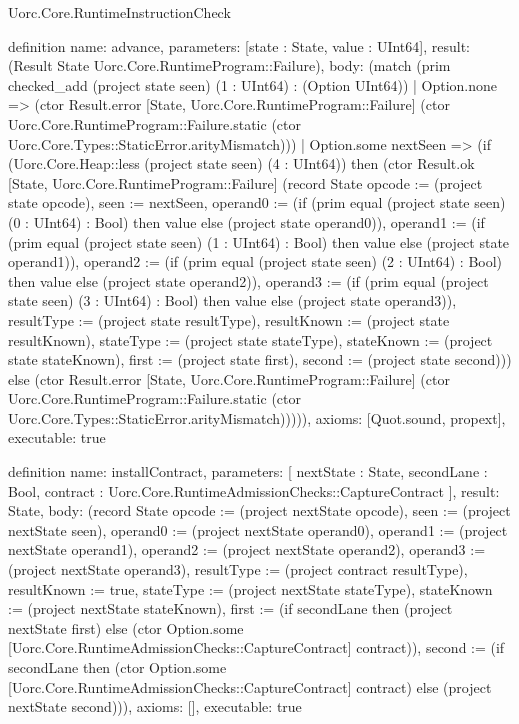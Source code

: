 \begin{lexlean}{Uorc.Core.RuntimeInstructionCheck}
\begin{semanticmodule}
definition{
  name: advance,
  parameters: [state : State, value : UInt64],
  result: (Result State Uorc.Core.RuntimeProgram::Failure),
  body: (match (prim checked_add (project state seen) (1 : UInt64) : (Option UInt64))
    | Option.none => (ctor Result.error [State, Uorc.Core.RuntimeProgram::Failure] (ctor Uorc.Core.RuntimeProgram::Failure.static (ctor Uorc.Core.Types::StaticError.arityMismatch)))
    | Option.some nextSeen => (if (Uorc.Core.Heap::less (project state seen) (4 : UInt64)) then (ctor Result.ok [State, Uorc.Core.RuntimeProgram::Failure] (record State {opcode := (project state opcode), seen := nextSeen, operand0 := (if (prim equal (project state seen) (0 : UInt64) : Bool) then value else (project state operand0)), operand1 := (if (prim equal (project state seen) (1 : UInt64) : Bool) then value else (project state operand1)), operand2 := (if (prim equal (project state seen) (2 : UInt64) : Bool) then value else (project state operand2)), operand3 := (if (prim equal (project state seen) (3 : UInt64) : Bool) then value else (project state operand3)), resultType := (project state resultType), resultKnown := (project state resultKnown), stateType := (project state stateType), stateKnown := (project state stateKnown), first := (project state first), second := (project state second)})) else (ctor Result.error [State, Uorc.Core.RuntimeProgram::Failure] (ctor Uorc.Core.RuntimeProgram::Failure.static (ctor Uorc.Core.Types::StaticError.arityMismatch))))),
  axioms: [Quot.sound, propext],
  executable: true
}

definition{
  name: installContract,
  parameters: [
    nextState : State,
    secondLane : Bool,
    contract : Uorc.Core.RuntimeAdmissionChecks::CaptureContract
  ],
  result: State,
  body: (record State {opcode := (project nextState opcode), seen := (project nextState seen), operand0 := (project nextState operand0), operand1 := (project nextState operand1), operand2 := (project nextState operand2), operand3 := (project nextState operand3), resultType := (project contract resultType), resultKnown := true, stateType := (project nextState stateType), stateKnown := (project nextState stateKnown), first := (if secondLane then (project nextState first) else (ctor Option.some [Uorc.Core.RuntimeAdmissionChecks::CaptureContract] contract)), second := (if secondLane then (ctor Option.some [Uorc.Core.RuntimeAdmissionChecks::CaptureContract] contract) else (project nextState second))}),
  axioms: [],
  executable: true
}


\end{semanticmodule}
\end{lexlean}
